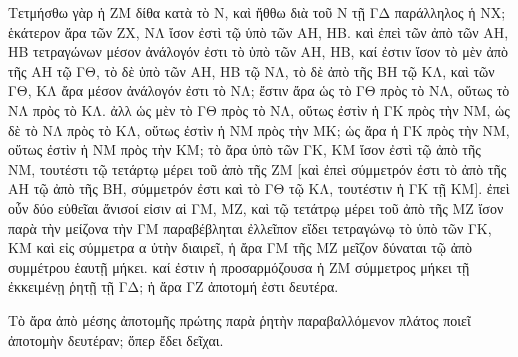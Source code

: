 \begin{Parallel}{}{}
{{\greekfont Τετμήσθω γὰρ ἡ ΖΜ δίθα κατὰ τὸ Ν, καὶ ἤθθω διὰ τοῦ
Ν τῇ ΓΔ παράλληλος ἡ ΝΧ; ἑκάτερον ἄρα τῶν
ΖΧ, ΝΛ  ἴσον ἐστὶ τῷ ὑπὸ τῶν ΑΗ, ΗΒ. καὶ ἐπεὶ
τῶν ἀπὸ τῶν ΑΗ, ΗΒ τετραγώνων μέσον ἀνάλογόν ἐστι τὸ
ὑπὸ τῶν ΑΗ, ΗΒ, καί ἐστιν ἴσον τὸ μὲν ἀπὸ τῆς ΑΗ τῷ
ΓΘ, τὸ δὲ ὑπὸ τῶν ΑΗ, ΗΒ τῷ ΝΛ, τὸ δὲ ἀπὸ τῆς ΒΗ τῷ
ΚΛ, καὶ τῶν ΓΘ, ΚΛ ἄρα μέσον ἀνάλογόν ἐστι τὸ ΝΛ; ἔστιν
ἄρα ὡς τὸ ΓΘ πρὸς τὸ ΝΛ, οὕτως τὸ ΝΛ πρὸς τὸ ΚΛ.
ἀλλ ὡς μὲν τὸ ΓΘ πρὸς τὸ ΝΛ, οὕτως ἐστὶν ἡ ΓΚ πρὸς τὴν
ΝΜ, ὡς δὲ τὸ ΝΛ πρὸς τὸ ΚΛ, οὕτως
ἐστὶν ἡ ΝΜ πρὸς τὴν ΜΚ; ὡς ἄρα ἡ ΓΚ πρὸς τὴν ΝΜ, οὕτως
ἐστὶν ἡ ΝΜ πρὸς τὴν ΚΜ; τὸ ἄρα ὑπὸ τῶν ΓΚ, ΚΜ
ἴσον ἐστὶ τῷ ἀπὸ τῆς ΝΜ, τουτέστι τῷ τετάρτῳ μέρει τοῦ
ἀπὸ τῆς ΖΜ [καὶ ἐπεὶ σύμμετρόν ἐστι τὸ ἀπὸ τῆς ΑΗ
τῷ ἀπὸ τῆς ΒΗ, σύμμετρόν ἐστι καὶ τὸ ΓΘ τῷ ΚΛ, τουτέστιν
ἡ ΓΚ τῇ ΚΜ]. ἐπεὶ οὖν δύο εὐθεῖαι ἄνισοί εἰσιν αἱ ΓΜ, ΜΖ,
καὶ τῷ τετάτρῳ μέρει τοῦ ἀπὸ τῆς ΜΖ ἴσον παρὰ τὴν μείζονα
τὴν ΓΜ παραβέβληται ἐλλεῖπον εἴδει τετραγώνῳ τὸ ὑπὸ τῶν
ΓΚ, ΚΜ καὶ εἰς σύμμετρα α ὐτὴν διαιρεῖ, ἡ ἄρα ΓΜ τῆς
ΜΖ μεῖζον δύναται τῷ ἀπὸ συμμέτρου ἑαυτῇ μήκει. καί
ἐστιν ἡ προσαρμόζουσα ἡ ΖΜ σύμμετρος μήκει τῇ ἐκκειμένῃ
ῥητῇ τῇ ΓΔ; ἡ ἄρα ΓΖ ἀποτομή ἐστι δευτέρα.}

{\greekfont Τὸ ἄρα ἀπὸ μέσης ἀποτομῆς πρώτης παρὰ ῥητὴν παραβαλλόμενον πλάτος ποιεῖ ἀποτομὴν δευτέραν; ὅπερ ἔδει δεῖχαι.}}

\end{Parallel}
